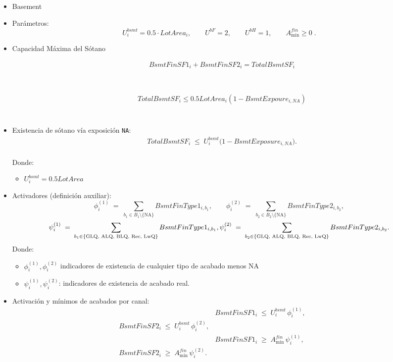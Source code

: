 \begin{itemize}
    \item{Basement}
    \item {Parámetros:}
\[
U^{bsmt}_i = 0.5\cdot LotArea_i,\qquad
U^{bF}=2,\qquad
U^{bH}=1,\qquad
A^{fin}_{\min}\ge 0 \;.
\]
    \item {Capacidad Máxima del Sótano}

\begin{align}
    &BsmtFinSF1_{i}+BsmtFinSF2_{i}=TotalBsmtSF_{i}\\
\end{align}\\
\\
\begin{align}
    &TotalBsmtSF_{i}\leq 0.5 LotArea_{i}(1-BsmtExpoure_{i,NA})\\
\end{align}\\


    \item {Existencia de sótano vía exposición \texttt{NA}:}\\
\begin{align}
& TotalBsmtSF_i \;\le\; U^{bsmt}_i \big(1 - BsmtExposure_{i,NA}\big). \label{eq:b-exist}
\end{align}\\
Donde:
    \begin{itemize}
        \item $U_{i}^{bsmt}=0.5LotArea$
    \end{itemize}

    \item {Activadores (definición auxiliar):}
\[
\phi^{(1)}_i \;=\; \sum_{b_1\in B_1\setminus\{\text{NA}\}} BsmtFinType1_{i,b_1}, \qquad
\phi^{(2)}_i \;=\; \sum_{b_2\in B_2\setminus\{\text{NA}\}} BsmtFinType2_{i,b_2},
\]
\[
\psi^{(1)}_i \;=\; \sum_{b_1\in \{\text{GLQ, ALQ, BLQ, Rec, LwQ}\}} BsmtFinType1_{i,b_1}, \qquad \\
\\ \psi^{(2)}_i \;=\; \sum_{b_2\in \{\text{GLQ, ALQ, BLQ, Rec, LwQ}\}} BsmtFinType2_{i,b_2}.
\]
Donde:
    \begin{itemize}
        \item $\phi_{i}^{(1)}, \phi_{i}^{(2)}$ indicadores de existencia de cualquier tipo de acabado menos NA
        \item $\psi _{i}^{(1)}, \psi_{i}^{(2)}$: indicadores de existencia de acabado real.
    \end{itemize}

    \item {Activación y mínimos de acabados por canal:}\\
\begin{align}
& BsmtFinSF1_i \;\le\; U^{bsmt}_i\, \phi^{(1)}_i, \qquad\\
  BsmtFinSF2_i \;\le\; U^{bsmt}_i\, \phi^{(2)}_i, \label{eq:b-on}\\
& BsmtFinSF1_i \;\ge\; A^{fin}_{\min}\, \psi^{(1)}_i, \qquad\\
  BsmtFinSF2_i \;\ge\; A^{fin}_{\min}\, \psi^{(2)}_i. \label{eq:b-min}
\end{align}\\


\end{itemize}
